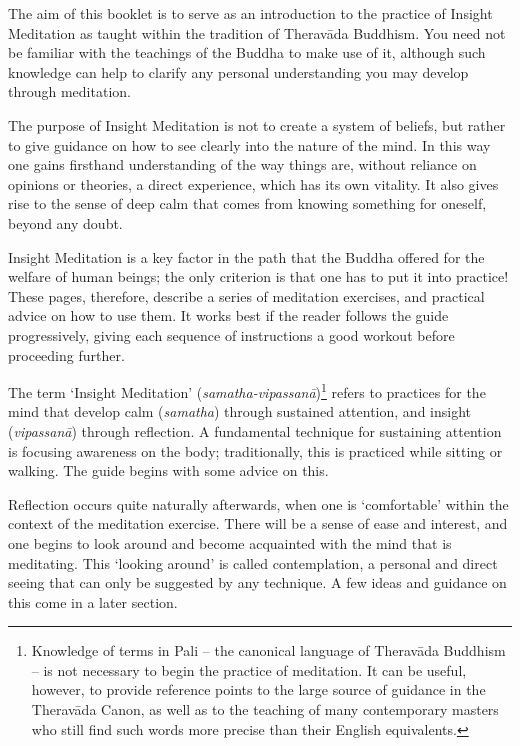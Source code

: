 
The aim of this booklet is to serve as an introduction to the practice\linebreak
of Insight Meditation as taught within the tradition of Theravāda
Buddhism. You need not be familiar with the teachings of the Buddha to
make use of it, although such knowledge can help to clarify any personal
understanding you may develop through meditation.

The purpose of Insight Meditation is not to create a system of beliefs, but rather to
give guidance on how to see clearly into the nature of the mind. In
this way one gains firsthand understanding of the way things are,
without reliance on opinions or theories, a direct experience, which has
its own vitality. It also gives rise to the sense of deep calm that
comes from knowing something for oneself, beyond any doubt.

Insight Meditation is a key factor in the path that the Buddha offered for the
welfare of human beings; the only criterion is that one has to put it
into practice! These pages, therefore, describe a series of meditation
exercises, and practical advice on how to use them. It works best if the
reader follows the guide progressively, giving each sequence of
instructions a good workout before proceeding further.

The term `Insight Meditation' (\emph{samatha-vipassanā})\footnote{Knowledge of terms in Pali -- the canonical language of
Theravāda Buddhism -- is not necessary to begin the practice of
meditation. It can be useful, however, to provide reference points to
the large source of guidance in the Theravāda Canon, as well as to the
teaching of many contemporary masters who still find such words more
precise than their English equivalents.}
refers to
practices for the mind that develop calm (\emph{samatha}) through
sustained attention, and insight (\emph{vipassanā}) through reflection.
A fundamental technique for sustaining attention is focusing awareness
on the body; traditionally, this is practiced while sitting or walking.
The guide begins with some advice on this.

Reflection occurs quite naturally afterwards, when one is `comfortable' within the context of
the meditation exercise. There will be a sense of ease and interest, and
one begins to look around and become acquainted with the mind that is
meditating. This `looking around' is called contemplation, a personal
and direct seeing that can only be suggested by any technique. A few
ideas and guidance on this come in a later section.

